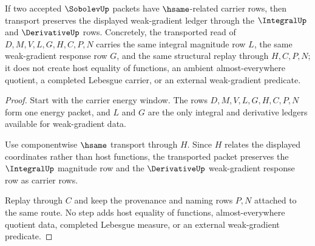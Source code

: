 \begin{theorem}
\label{thm:sobolev-weak-gradient-transport}
If two accepted $\SobolevUp$ packets have $\hsame$-related carrier rows, then transport preserves the displayed weak-gradient ledger through the $\IntegralUp$ and $\DerivativeUp$ rows. Concretely, the transported read of $D,M,V,L,G,H,C,P,N$ carries the same integral magnitude row $L$, the same weak-gradient response row $G$, and the same structural replay through $H,C,P,N$; it does not create host equality of functions, an ambient almost-everywhere quotient, a completed Lebesgue carrier, or an external weak-gradient predicate.
\end{theorem}
\begin{proof}
Start with the carrier energy window. The rows $D,M,V,L,G,H,C,P,N$ form one energy packet, and $L$ and $G$ are the only integral and derivative ledgers available for weak-gradient data.

Use componentwise $\hsame$ transport through $H$. Since $H$ relates the displayed coordinates rather than host functions, the transported packet preserves the $\IntegralUp$ magnitude row and the $\DerivativeUp$ weak-gradient response row as carrier rows.

Replay through $C$ and keep the provenance and naming rows $P,N$ attached to the same route. No step adds host equality of functions, almost-everywhere quotient data, completed Lebesgue measure, or an external weak-gradient predicate.
\end{proof}

